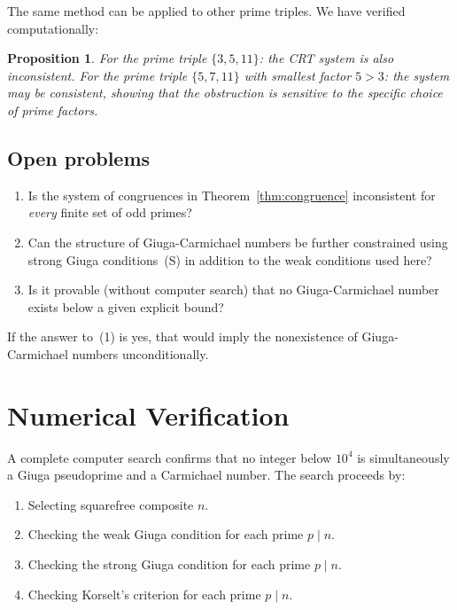 \documentclass[12pt,a4paper]{amsart}
\newtheorem{proposition}[theorem]{Proposition}
\theoremstyle{definition}
\begin{document}
The same method can be applied to other prime triples.  We have verified
computationally:

\begin{proposition}
For the prime triple $\{3, 5, 11\}$: the CRT system is also inconsistent.
For the prime triple $\{5, 7, 11\}$ with smallest factor $5 > 3$: the system
may be consistent, showing that the obstruction is sensitive to the specific
choice of prime factors.
\end{proposition}

\subsection{Open problems}

\begin{enumerate}
  \item Is the system of congruences in Theorem~\ref{thm:congruence}
        inconsistent for \emph{every} finite set of odd primes?
  \item Can the structure of Giuga-Carmichael numbers be further constrained
        using strong Giuga conditions~(S) in addition to the weak conditions used
        here?
  \item Is it provable (without computer search) that no Giuga-Carmichael
        number exists below a given explicit bound?
\end{enumerate}

If the answer to~(1) is yes, that would imply the nonexistence of
Giuga-Carmichael numbers unconditionally.

\section{Numerical Verification}

A complete computer search confirms that no integer below $10^4$ is
simultaneously a Giuga pseudoprime and a Carmichael number.  The search
proceeds by:
\begin{enumerate}
  \item Selecting squarefree composite $n$.
  \item Checking the weak Giuga condition for each prime $p \mid n$.
  \item Checking the strong Giuga condition for each prime $p \mid n$.
  \item Checking Korselt's criterion for each prime $p \mid n$.
\end{enumerate}
\end{document}
